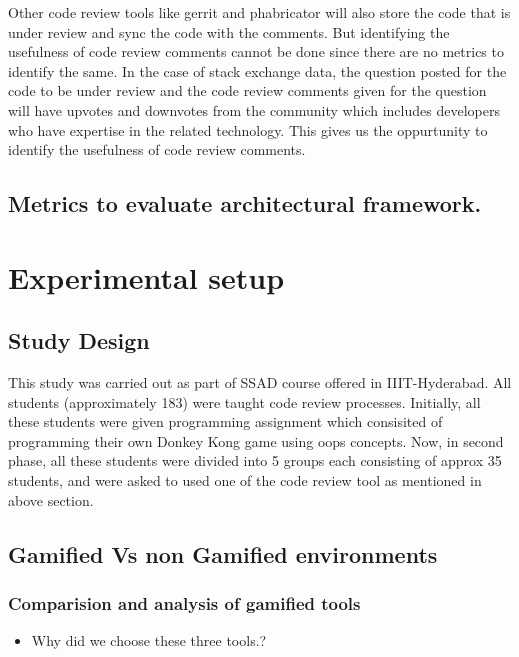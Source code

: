 \documentclass[conference]{IEEEtran}
\begin{document}
Other code review tools like gerrit and phabricator will also store the code that is under review and sync the code with the comments. But identifying the usefulness of code review comments cannot be done since there are no metrics to identify the same. In the case of stack exchange data, the question posted for the code to be under review and the code review comments given for the question will have upvotes and downvotes from the community which includes developers who have expertise in the related technology. This gives us the oppurtunity to identify the usefulness of code review comments.

\subsection{Metrics to evaluate architectural framework.}


\section{Experimental setup}

\subsection{Study Design}

This study was carried out as part of SSAD course offered in IIIT-Hyderabad. All students (approximately 183) were taught code review processes. Initially, all these students were given programming assignment which consisited of programming their own Donkey Kong game using oops concepts.
Now, in second phase, all these students were divided into 5 groups each consisting of approx 35 students, and were asked to used one of the code review tool as mentioned in above section.

\subsection{Gamified Vs non Gamified environments}
\subsubsection{Comparision and analysis of gamified tools}
\begin{itemize}
\item Why did we choose these three tools.?
\end{itemize}
\end{document}
